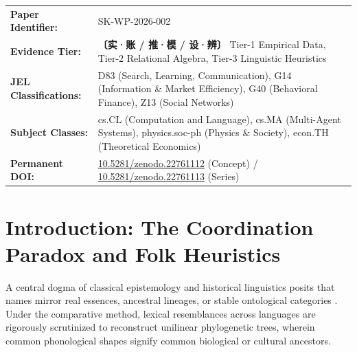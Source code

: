 \documentclass[11pt,a4paper]{article}
\begin{document}
\vspace{1em}
\begin{center}
\small
\begin{tabular}{ll}
\toprule
\textbf{Paper Identifier:} & SK-WP-2026-002 \\
\textbf{Evidence Tier:} & \textbf{〔实·账 / 推·模 / 设·辨〕} Tier-1 Empirical Data, Tier-2 Relational Algebra, Tier-3 Linguistic Heuristics \\
\textbf{JEL Classifications:} & D83 (Search, Learning, Communication), G14 (Information \& Market Efficiency), G40 (Behavioral Finance), Z13 (Social Networks) \\
\textbf{Subject Classes:} & cs.CL (Computation and Language), cs.MA (Multi-Agent Systems), physics.soc-ph (Physics \& Society), econ.TH (Theoretical Economics) \\
\textbf{Permanent DOI:} & \href{https://doi.org/10.5281/zenodo.22761112}{10.5281/zenodo.22761112} (Concept) / \href{https://doi.org/10.5281/zenodo.22761113}{10.5281/zenodo.22761113} (Series) \\
\bottomrule
\end{tabular}
\end{center}

\newpage

\section{Introduction: The Coordination Paradox and Folk Heuristics}

A central dogma of classical epistemology and historical linguistics posits that names mirror real essences, ancestral lineages, or stable ontological categories \cite{kripke1980naming, campbell2013historical}. Under the comparative method, lexical resemblances across languages are rigorously scrutinized to reconstruct unilinear phylogenetic trees, wherein common phonological shapes signify common biological or cultural ancestors. 
\end{document}
